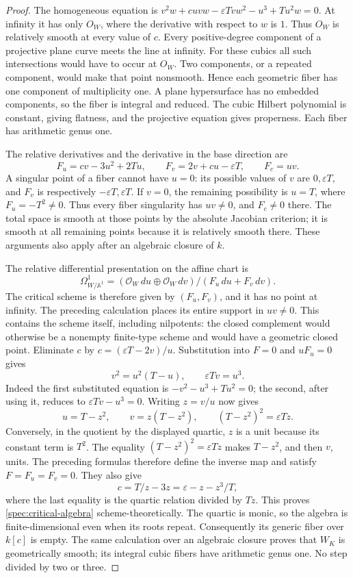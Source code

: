 \begin{proof}
The homogeneous equation is
$v^2w+cuvw-\varepsilon Tvw^2-u^3+Tu^2w=0$.
At infinity it has only $O_W$, where the derivative with respect to
$w$ is $1$.  Thus $O_W$ is relatively smooth at every value of $c$.
Every positive-degree component of a projective plane curve meets
the line at infinity.  For these cubics all such intersections would
have to occur at $O_W$.  Two components, or a repeated component,
would make that point nonsmooth.  Hence each geometric fiber has
one component of multiplicity one.  A plane hypersurface has no
embedded components, so the fiber is integral and reduced.  The
cubic Hilbert polynomial is constant, giving flatness, and the
projective equation gives properness.  Each fiber has arithmetic
genus one.

The relative derivatives and the derivative in the base direction are
\begin{equation}
F_u=cv-3u^2+2Tu,\qquad
F_v=2v+cu-\varepsilon T,\qquad F_c=uv.
\label{spec:derivatives}
\end{equation}
A singular point of a fiber cannot have $u=0$: its possible values
of $v$ are $0,\varepsilon T$, and $F_v$ is respectively
$-\varepsilon T,\varepsilon T$.  If $v=0$, the remaining possibility
is $u=T$, where $F_u=-T^2\ne0$.  Thus every fiber singularity has
$uv\ne0$, and $F_c\ne0$ there.  The total space is smooth at those
points by the absolute Jacobian criterion; it is smooth at all
remaining points because it is relatively smooth there.  These
arguments also apply after an algebraic closure of $k$.

The relative differential presentation on the affine chart is
\[
\Omega^1_{W/\mathbb A^1}
=(\mathcal O_W\,du\oplus\mathcal O_W\,dv)/(F_u\,du+F_v\,dv).
\]
The critical scheme is therefore given by $(F_u,F_v)$, and it has
no point at infinity.  The preceding calculation places its entire
support in $uv\ne0$.  This contains the scheme itself, including
nilpotents: the closed complement would otherwise be a nonempty
finite-type scheme and would have a geometric closed point.
Eliminate $c$ by $c=(\varepsilon T-2v)/u$.  Substitution into $F=0$
and $uF_u=0$ gives
\[
v^2=u^2(T-u),\qquad \varepsilon Tv=u^3.
\]
Indeed the first substituted equation is $-v^2-u^3+Tu^2=0$;
the second, after using it, reduces to $\varepsilon Tv-u^3=0$.
Writing $z=v/u$ now gives
\[
u=T-z^2,\qquad v=z(T-z^2),\qquad
(T-z^2)^2=\varepsilon Tz.
\]
Conversely, in the quotient by the displayed quartic, $z$ is a
unit because its constant term is $T^2$.  The equality
$(T-z^2)^2=\varepsilon Tz$ makes $T-z^2$, and then $v$, units.
The preceding formulas therefore define the inverse map and satisfy
$F=F_u=F_v=0$.  They also give
\[
c=T/z-3z=\varepsilon-z-z^3/T,
\]
where the last equality is the quartic relation divided by $Tz$.
This proves \eqref{spec:critical-algebra} scheme-theoretically.
The quartic is monic, so the algebra is finite-dimensional even when
its roots repeat.  Consequently its generic fiber over $k[c]$ is
empty.  The same calculation over an algebraic closure proves that
$W_K$ is geometrically smooth; its integral cubic fibers have
arithmetic genus one.  No step divided by two or three.
\end{proof}

